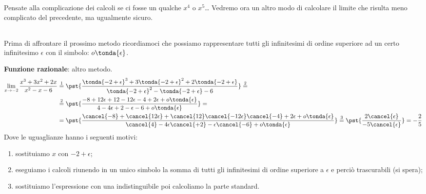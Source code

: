 \begin{osservazione}
Pensate alla complicazione dei calcoli se ci fosse un qualche \(x^4\) o
\(x^5\)\dots
Vedremo ora un altro modo di calcolare il limite che risulta meno 
complicato del precedente, ma ugualmente sicuro.
\end{osservazione}\\

Prima di affrontare il prossimo metodo ricordiamoci che possiamo 
rappresentare tutti gli infinitesimi di ordine superiore ad un certo 
infinitesimo \(\epsilon\) con il simbolo: \(o\tonda{\epsilon}\).

\begin{esempio}
\textbf{Funzione razionale}: altro metodo.
\begin{align*}
\lim_{x \rightarrow -2} \frac{x^3+3x^2+2x}{x^2-x-6} & \stackrel{1}{=} 
\pst{\frac
  {\tonda{-2+\epsilon}^3+3\tonda{-2+\epsilon}^2+2\tonda{-2+\epsilon}}
  {\tonda{-2+\epsilon}^2-\tonda{-2+\epsilon}-6}} \stackrel{2}{=}\\ 
  &\stackrel{2}{=}\pst{\frac{-8+12\epsilon+12-12\epsilon-4+2\epsilon+
                             o\tonda{\epsilon}}
                           {4-4\epsilon+2-\epsilon-6+o\tonda{\epsilon}
                           }}=\\ 
  &=\pst{\frac{\cancel{-8}+\cancel{12\epsilon}+
               \cancel{12}\cancel{-12\epsilon}\cancel{-4}+2\epsilon+
               o\tonda{\epsilon}}
              {\cancel{4}-4\epsilon\cancel{+2}-\epsilon\cancel{-6}+
               o\tonda{\epsilon}}}\stackrel{3}{=}
    \pst{\frac{2\cancel{\epsilon}}{-5\cancel{\epsilon}}} = -\frac{2}{5}
\end{align*}
Dove le uguaglianze hanno i seguenti motivi:
\begin{enumerate} [nosep]
 \item sostituiamo \(x\) con \(-2+\epsilon\);
 \item eseguiamo i calcoli riunendo in un unico simbolo la somma di tutti gli 
infinitesimi di ordine superiore a \(\epsilon\) e perciò trascurabili 
(si spera);
 \item sostituiamo l'espressione con una indistinguibile poi calcoliamo la 
parte standard.
\end{enumerate}
\end{esempio}

